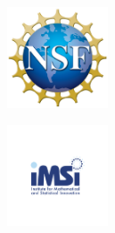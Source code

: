 \vspace{-4ex}
\begin{center}

	    \begin{minipage}{0.2\textwidth}
		\centering
		\includegraphics[height=3cm]{Photos/nsf_logo.png}
	\end{minipage}
	\begin{minipage}{0.2\textwidth}
		\centering
		\includegraphics[height=3cm]{Photos/imsi_logo.png}
	\end{minipage} \\[1em]
	

\end{center}
